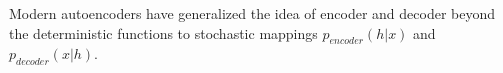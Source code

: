 






Modern autoencoders have generalized the idea of encoder and decoder beyond the deterministic functions to stochastic mappings $p_{encoder}(h | x)$ and $p_{decoder}(x | h)$.


